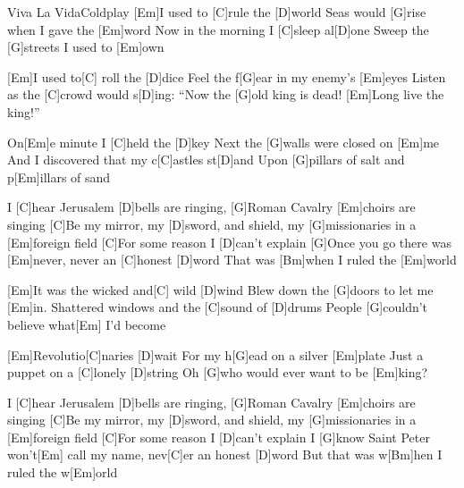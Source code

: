 \documentclass[../main.tex]{subfiles}
\begin{document}
\begin{song}[1]{Viva La Vida}{Coldplay}{}
[Em]I used to [C]rule the [D]world
Seas would [G]rise when I gave the [Em]word
Now in the morning I [C]sleep al[D]one
Sweep the [G]streets I used to [Em]own

[Em]I used to[C] roll the [D]dice
Feel the f[G]ear in my enemy's [Em]eyes
Listen as the [C]crowd would s[D]ing:
``Now the [G]old king is dead! [Em]Long live the king!''

On[Em]e minute I [C]held the [D]key
Next the [G]walls were closed on [Em]me
And I discovered that my c[C]astles st[D]and
Upon [G]pillars of salt and p[Em]illars of sand

I [C]hear Jerusalem [D]bells are ringing, [G]Roman Cavalry [Em]choirs are singing
[C]Be my mirror, my [D]sword, and shield, my [G]missionaries in a [Em]foreign field
[C]For some reason I [D]can't explain
[G]Once you go there was [Em]never, never an [C]honest [D]word
That was [Bm]when I ruled the [Em]world

[Em]It was the wicked and[C] wild [D]wind
Blew down the [G]doors to let me [Em]in.
Shattered windows and the [C]sound of [D]drums
People [G]couldn't believe what[Em] I'd become

[Em]Revolutio[C]naries [D]wait
For my h[G]ead on a silver [Em]plate
Just a puppet on a [C]lonely [D]string
Oh [G]who would ever want to be [Em]king?

I [C]hear Jerusalem [D]bells are ringing, [G]Roman Cavalry [Em]choirs are singing
[C]Be my mirror, my [D]sword, and shield, my [G]missionaries in a [Em]foreign field
[C]For some reason I [D]can't explain
I [G]know Saint Peter won't[Em] call my name, nev[C]er an honest [D]word
But that was w[Bm]hen I ruled the w[Em]orld
\end{song}
\end{document}
